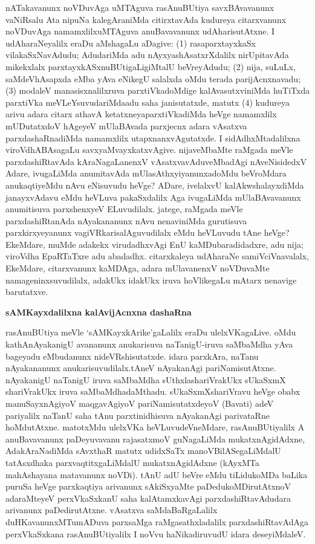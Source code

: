 nATakavanunx noVDuvAga uMTAguva rasAnuBUtiya savxBAvavanunx vaNiR\-salu Ata nipuNa kalegAraniMda citirxtavAda kudureya citarxvanunx noVDuvAga namamxlilx\break uMTAguva anuBavavanunx udAharisutAtxne. I udAharaNeyalilx eraDu aMsha\-gaLu aDagive: (1) rasaparxtayxkaSx vilakaSxNavAdudu; AdudariMda adu nAyxyashAsatxrXdalilx nirUpitavAda mikekxlalx parxtayxkASxnuBUtigaLigiMtalU beVreyAdudu; (2) nija, \hbox{suLuLx}, saMdeVhAsapxda eMba yAva eNikegU salalxda oMdu terada parijAcnxnavadu; (3) modaleV manasisxnalilxruva parxtiVkadoMdige kalAvasutxviniMda huTiTxda parxtiVka meVLeYsuvudariMda\break adu saha janisutatxde, matutx (4) kudureya arivu adara citarx athavA ketatxneya\break parxtiVkadiMda heVge namamxlilx mUDutatxdoV hAgeyeV mUlaBAvada parxjecnx adara vAsatxva parxdashaRnadiMda namamxlilx utapxnanxvAgutatxde. I sidAdhxMtadalilxna viroVdhABAsagaLu savxyaM\break\-vayxkatxvAgive. nijaveMbaMte raMgada meVle parxdashiRtavAda kAraNagaLanenxV vAsatxvavAdu\break\-veMbadAgi nAveNisidedxV Adare, ivugaLiMda anumitavAda mUlasAthxyiyanunx\break adoMdu beVroMdara anukaqtiyeMdu nAvu eNisuvudu heVge? ADare, ive\-lalxvU kalAkwshalayxdiMda janayxvAdavu eMdu heVLuva pakaSxdalilx Aga ivugaLiMda mUla\-BAvavanunx anumitisuva parxshenxyeV ELuvudilalx. jatege, raMgada meVle parxdashiRtanAda nAyakananunx nAvu nenaviniMda gurutisuva parxkirxyeyanunx vagiVRkarisalAguvudilalx eMdu heVLuvudu tAne heVge? EkeMdare, muMde adakekx virudadhxvAgi EnU kaMDu\-baradidadxre, adu nija; viroVdha EpaRTaTxre adu abadadhx. citarxkaleya udAharaNe samiVciVnavalalx, EkeMdare, citarxvanunx kaMDAga, adara mUlavanenxV noVDuvaMte nama\-geninxsuvudilalx, adakUkx idakUkx iruva hoVlikegaLu mAtarx nenavige barutatxve.

\bigskip
\begin{center}
{\Large\bf sAMKayxdalilxna kalAvijAcnxna dashaRna}
\end{center}

rasAnuBUtiya meVle `sAMKayxkArike'gaLalilx eraDu ulelxVKagaLive. oMdu kathA\-nAyakanigU avananunx anukarisuva naTanigU-iruva saMbaMdha yAva bageyadu eMbudanunx nideVRshisutatxde. idara parxkAra, naTanu nAyakananunx anukarisuvu\-dilalx.\break tAneV nAyakanAgi pariNamisutAtxne. nAyakanigU naTanigU iruva saMbaMdha sUthxla\-shariVrakUkx sUkaSxmX shariVrakUkx iruva saMbaMdhadaMthadu. sUkaSxmXshariVravu heVge obabx manuSayxnAgiyoV maqgavAgiyoV pariNamisutatxdeyoV (Bavati) adeV pariyalilx naTanU saha tAnu parxtinidhisuva nAyakanAgi parivataRne hoMdutAtxne. matotxMdu ulelxVKa heVLuvudeVneMdare, rasAnuBUtiyalilx A anuBavavanunx paDeyuvavanu rajasatxmoV guNagaLiMda mukatxnAgidAdxne, AdakAraNadiMda sAvxthaR matutx udidxSaTx manoVBilASegaLiMdalU tatAsxdhaka parxvaqtitxgaLiMdalU mukatxnAgidAdxne (kAyxMTa mahAshayana matavanunx noVDi). tAnU adU beVre eMdu tiLidukoMDa baLika puruSa heVge parxkaqtiya arivanunx sAkiSxyaMte paDedukoMDirutAtxnoV adaraMteyeV perxVkaSxkanU saha kalAtamxkavAgi parxdashiRtavAdudara arivanunx paDedirutAtxne. vAsatxva saMdaBaRgaLalilx duHKavanunxMTumADuva parxsaMga raMgasathxladalilx parxdashiRtavAdAga perxVkaSxkana rasAnuBUtiyalilx I noVvu haNikadiruvudU idara deseyiMdaleV.

